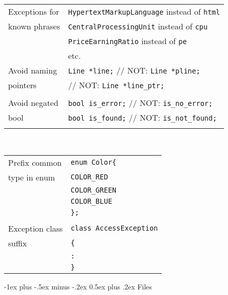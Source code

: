 \documentclass[10pt,landscape]{article}
\makeatletter
\renewcommand{\section}{\@startsection{section}{1}{0mm}%
                                {-1ex plus -.5ex minus -.2ex}%
                                {0.5ex plus .2ex}%
                                {\normalfont\large\bfseries}}
\makeatother
\begin{document}
\begin{multicols}{3}
\begin{tabular}{@{}ll@{}}
	Exceptions for  & \verb!HypertextMarkupLanguage! instead of \verb!html! \\
	known phrases   & \verb!CentralProcessingUnit! instead of \verb!cpu! \\
	                & \verb!PriceEarningRatio! instead of \verb!pe! \\
	                & etc. \\
	Avoid naming    & \verb!Line *line;! // NOT: \verb!Line *pline;! \\
	pointers        &                    // NOT: \verb!Line *line_ptr;! \\
	                & \\
	Avoid negated   & \verb!bool is_error;! // NOT: \verb!is_no_error;! \\
	bool            & \verb!bool is_found;! // NOT: \verb!is_not_found;! \\
	                & \\
\end{tabular} \\

\begin{tabular}{@{}ll@{}}
	Prefix common   & \verb!enum Color{! \\
	type in enum    & \hspace{0.2cm} \verb!COLOR_RED! \\
	                & \hspace{0.2cm} \verb!COLOR_GREEN! \\
	                & \hspace{0.2cm} \verb!COLOR_BLUE! \\
	                & \verb!};! \\
	                & \\
	Exception class & \verb!class AccessException! \\
	suffix          & \verb!{! \\
	                & \hspace{0.2cm} \verb!:! \\
	                & \verb!}! \\
\end{tabular}

\section{Files}

\end{multicols}
\end{document}
